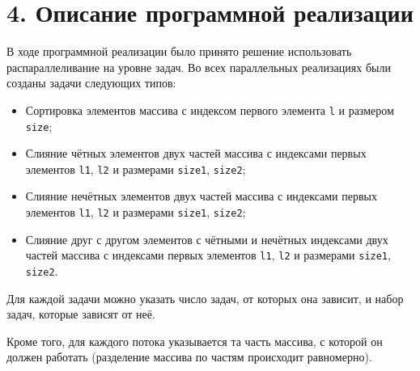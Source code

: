 \documentclass{report}
\begin{document}
    \section*{4. Описание программной реализации}
    \par В ходе программной реализации было принято решение использовать распараллеливание на уровне задач. Во всех параллельных реализациях были созданы задачи следующих типов:
    \begin{itemize}
        \item Сортировка элементов массива с индексом первого элемента \verb|l| и размером \verb|size|;
        \item Слияние чётных элементов двух частей массива с индексами первых элементов \verb|l1|, \verb|l2| и размерами \verb|size1|, \verb|size2|;
        \item Слияние нечётных элементов двух частей массива с индексами первых элементов \verb|l1|, \verb|l2| и размерами \verb|size1|, \verb|size2|;
        \item Слияние друг с другом элементов с чётными и нечётных индексами двух частей массива с индексами первых элементов \verb|l1|, \verb|l2| и размерами \verb|size1|, \verb|size2|.
    \end{itemize}
    \par Для каждой задачи можно указать число задач, от которых она зависит, и набор задач, которые зависят от неё.
    \par Кроме того, для каждого потока указывается та часть массива, с которой он должен работать (разделение массива по частям происходит равномерно).
    
\end{document}
